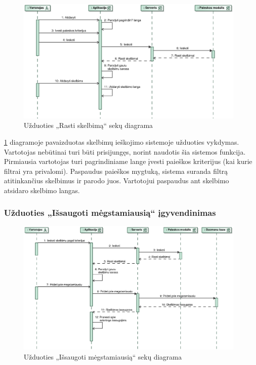 \documentclass[12pt]{article}
\begin{document}
	\begin{figure}[h]
		\begin{center}
			\includegraphics[width=\textwidth]{RastiSkelbima.eps}
			\caption{Užduoties „Rasti skelbimą“ sekų diagrama\label{FindAdvertSeq}}
		\end{center}
	\end{figure}
	
	\ref{FindAdvertSeq} diagramoje pavaizduotas skelbimų ieškojimo sistemoje užduoties vykdymas. Vartotojas nebūtinai turi būti prisijungęs, norint naudotis šia sistemos funkcija. Pirmiausia vartotojas turi pagrindiniame lange įvesti paieškos kriterijus (kai kurie filtrai yra privalomi). Paspaudus paieškos mygtuką, sistema suranda filtrą atitinkančius skelbimus ir parodo juos. Vartotojui paspaudus ant skelbimo atsidaro skelbimo langas.
	\pagebreak
	
	\subsubsection{Užduoties „Išsaugoti mėgstamiausią“ įgyvendinimas}
	
	\begin{figure}[h]
		\begin{center}
			\includegraphics[width=\textwidth]{IssaugotiMegstamiausia.eps}
			\caption{Užduoties „Išsaugoti mėgstamiausią“ sekų diagrama\label{SaveFavSeq}}
		\end{center}
	\end{figure}
	
\end{document}

